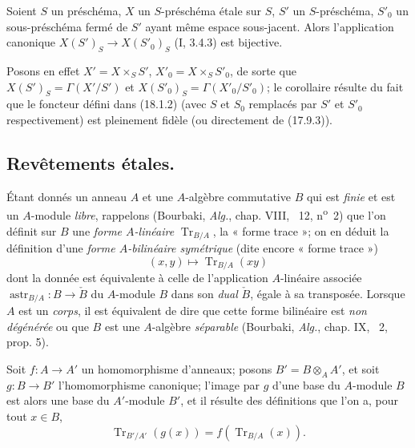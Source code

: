 \begin{corollary}[18.1.3]
\label{IV.18.1.3}
Soient $S$ un préschéma, $X$ un $S$-préschéma étale sur $S$, $S'$ un $S$-préschéma, $S'_0$ un sous-préschéma fermé de $S'$ ayant même espace sous-jacent. Alors l'application canonique $X(S')_S\to X(S'_0)_S$ (I, 3.4.3) est bijective.
\end{corollary}

Posons en effet $X'=X\times_S S'$, $X'_0=X\times_S S'_0$, de sorte que $X(S')_S=\Gamma(X'/S')$ et $X(S'_0)_S=\Gamma(X'_0/S'_0)$; le corollaire résulte du fait que le foncteur défini dans (18.1.2) (avec $S$ et $S_0$ remplacés par $S'$ et $S'_0$ respectivement) est pleinement fidèle (ou directement de (17.9.3)).

\subsection{Revêtements étales.}


\begin{env}[18.2.1]
Étant donnés un anneau $A$ et une $A$-algèbre commutative $B$ qui est \emph{finie} et est un $A$-module \emph{libre}, rappelons (Bourbaki, \emph{Alg.}, chap. VIII, \textsection~12, n\textsuperscript{o}~2) que l'on définit sur $B$ une \emph{forme $A$-linéaire} $\operatorname{Tr}_{B/A}$, la « forme trace »; on en déduit la définition d'une \emph{forme $A$-bilinéaire symétrique} (dite encore « forme trace »)
\begin{equation}
  (x,y)\longmapsto\operatorname{Tr}_{B/A}(xy)
  \tag{18.2.1.1}\label{IV.18.2.1.1}
\end{equation}
dont la donnée est équivalente à celle de l'application $A$-linéaire associée $\operatorname{astr}_{B/A}:B\to\check B$ du $A$-module $B$ dans son \emph{dual} $\check B$, égale à sa transposée. Lorsque $A$ est un \emph{corps}, il est équivalent de dire que cette forme bilinéaire est \emph{non dégénérée} ou que $B$ est une $A$-algèbre \emph{séparable} (Bourbaki, \emph{Alg.}, chap. IX, \textsection~2, prop. 5).

Soit $f:A\to A'$ un homomorphisme d'anneaux; posons $B'=B\otimes_A A'$, et soit $g:B\to B'$ l'homomorphisme canonique; l'image par $g$ d'une base du $A$-module $B$ est alors une base du $A'$-module $B'$, et il résulte des définitions que l'on a, pour tout $x\in B$,
\begin{equation}
  \operatorname{Tr}_{B'/A'}(g(x))=f(\operatorname{Tr}_{B/A}(x)).
  \tag{18.2.1.2}\label{IV.18.2.1.2}
\end{equation}
\end{env}

